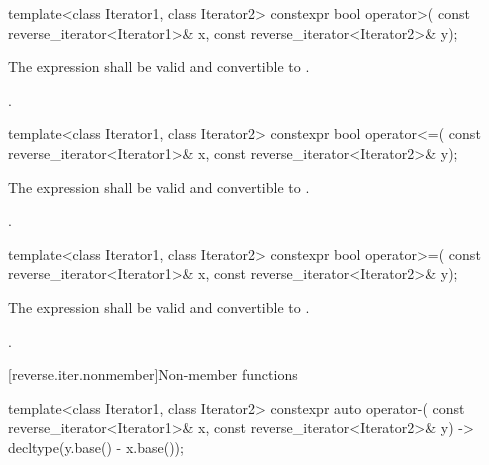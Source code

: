%
\begin{itemdecl}
template<class Iterator1, class Iterator2>
  constexpr bool operator>(
    const reverse_iterator<Iterator1>& x,
    const reverse_iterator<Iterator2>& y);
\end{itemdecl}

\begin{itemdescr}
\pnum
\constraints
The expression  shall be valid and
convertible to .

\pnum
\returns
{}.
\end{itemdescr}

%
\begin{itemdecl}
template<class Iterator1, class Iterator2>
  constexpr bool operator<=(
    const reverse_iterator<Iterator1>& x,
    const reverse_iterator<Iterator2>& y);
\end{itemdecl}

\begin{itemdescr}
\pnum
\constraints
The expression  shall be valid and
convertible to .

\pnum
\returns
{}.
\end{itemdescr}

%
\begin{itemdecl}
template<class Iterator1, class Iterator2>
  constexpr bool operator>=(
    const reverse_iterator<Iterator1>& x,
    const reverse_iterator<Iterator2>& y);
\end{itemdecl}

\begin{itemdescr}
\pnum
\constraints
The expression  shall be valid and
convertible to .

\pnum
\returns
{}.
\end{itemdescr}

[reverse.iter.nonmember]{Non-member functions}

%
\begin{itemdecl}
template<class Iterator1, class Iterator2>
  constexpr auto operator-(
    const reverse_iterator<Iterator1>& x,
    const reverse_iterator<Iterator2>& y) -> decltype(y.base() - x.base());
\end{itemdecl}

